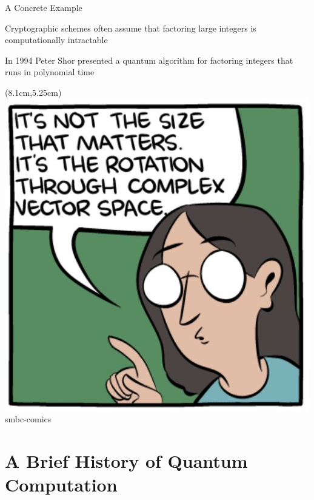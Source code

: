 \documentclass{beamer}
\begin{document}
\begin{frame}{A Concrete Example}

  Cryptographic schemes often assume that factoring large integers is
  computationally intractable
  
  In 1994 Peter Shor presented a quantum \alert{algorithm} for factoring
  integers that runs in \alert{polynomial time} 

  \vspace{2.5cm}

  \begin{textblock*}{4cm}(8.1cm,5.25cm)
    \includegraphics[scale=0.2]{images/size.jpg}
    \tiny{smbc-comics}
  \end{textblock*}

\end{frame}


\section{A Brief History of Quantum Computation}
\end{document}
